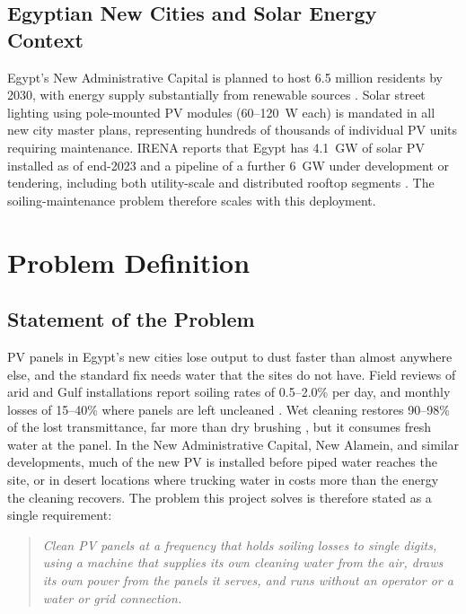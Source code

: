 \documentclass[12pt,a4paper]{report}   %
\begin{document}
\section{Egyptian New Cities and Solar Energy Context}

Egypt's New Administrative Capital is planned to host 6.5 million residents by 2030, with
energy supply substantially from renewable sources \cite{egypt2030vision}. Solar street lighting
using pole-mounted PV modules (60--120~W each) is mandated in all new city master plans,
representing hundreds of thousands of individual PV units requiring maintenance. IRENA reports
that Egypt has 4.1~GW of solar PV installed as of end-2023 and a pipeline of a further 6~GW under
development or tendering, including both utility-scale and distributed rooftop segments
\cite{irena2023egypt}. The soiling-maintenance problem therefore scales with this deployment.

\chapter{Problem Definition}
\label{ch:problem}

\section{Statement of the Problem}

PV panels in Egypt's new cities lose output to dust faster than almost anywhere
else, and the standard fix needs water that the sites do not have. Field reviews of
arid and Gulf installations report soiling rates of 0.5--2.0\% per day, and monthly
losses of 15--40\% where panels are left uncleaned \cite{kazem2023soiling,sarver2013pvsoiling}.
Wet cleaning restores 90--98\% of the lost transmittance, far more than dry brushing
\cite{mejia2021cleaning}, but it consumes fresh water at the panel. In the New
Administrative Capital, New Alamein, and similar developments, much of the new PV is
installed before piped water reaches the site, or in desert locations where trucking
water in costs more than the energy the cleaning recovers. The problem this project
solves is therefore stated as a single requirement:

\begin{quote}
\itshape
Clean PV panels at a frequency that holds soiling losses to single digits, using a
machine that supplies its own cleaning water from the air, draws its own power from the
panels it serves, and runs without an operator or a water or grid connection.
\end{quote}
\end{document}
